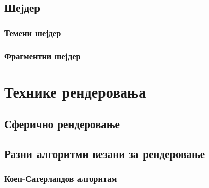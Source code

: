 \documentclass[12pt]{article}
\begin{document}
	\subsection{Шејдер}
	
	\subsubsection{Темени шејдер}
		
	\subsubsection{Фрагментни шејдер}
	
	\section{Технике рендеровања}
	
	\subsection{Сферично рендеровање}\label{sfericnorenderovanje}
	
	\subsection{Разни алгоритми везани за рендеровање}
	
	\subsubsection{Коен-Сатерландов алгоритам}\label{koensaterland}
\end{document}
